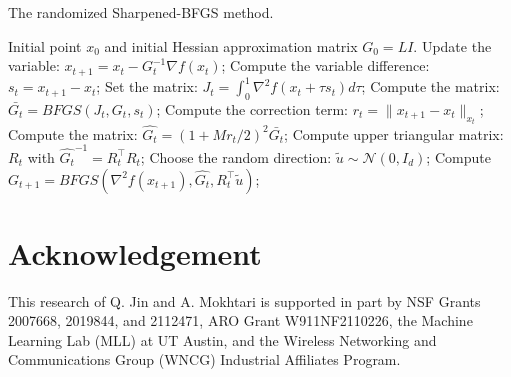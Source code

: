 \documentclass[11pt]{article}
\numberwithin{assumption}{section}
\numberwithin{remark}{section}
\numberwithin{theorem}{section}
\begin{document}
\begin{algorithm}[t]
\caption{The randomized Sharpened-BFGS method.}\label{algo_random} 
\begin{algorithmic}[1] 
{\REQUIRE Initial point $x_0$ and initial Hessian approximation matrix $G_0 = LI$.
    \STATE Update the variable: $x_{t + 1} = x_t - G_t^{-1} \nabla{f(x_t)}$;
    \STATE Compute the variable difference: $s_t = x_{t + 1} - x_t$;
    \STATE Set the matrix: $J_t = \int_{0}^{1}\nabla^2{f(x_t + \tau s_t)}d\tau$;
    \STATE Compute the matrix: $\bar{G_t} = BFGS(J_t, G_t, s_t)$;
    \STATE Compute the correction term: $r_t = \|x_{t + 1} - x_{t}\|_{x_t}$;
    \STATE Compute the matrix: $\hat{G_t} = (1 + {Mr_t}/{2})^2\bar{G_t}$;
    \STATE Compute upper triangular matrix: $R_t$ with $\hat{G_t}^{-1} = R_t^\top R_t$;
    \STATE Choose the random direction: $\tilde{u} \sim \mathcal{N}(0, I_d)$;
    \STATE Compute $G_{t + 1} = BFGS(\nabla^2{f(x_{t + 1})}, \hat{G_t}, R_t^\top \tilde{u})$;
\ENDFOR}
\end{algorithmic}
\end{algorithm}


\section*{Acknowledgement}
This research of Q. Jin and A. Mokhtari is supported in part by NSF Grants 2007668, 2019844, and 2112471, ARO Grant W911NF2110226, the Machine Learning Lab (MLL) at UT Austin, and the Wireless Networking and Communications Group (WNCG) Industrial Affiliates Program.  

\newpage

{{


}}
\end{document}

